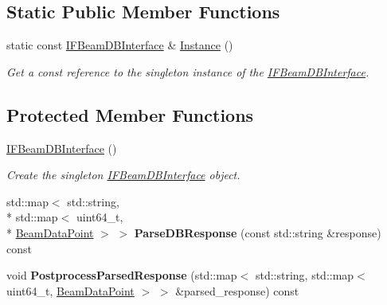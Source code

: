 \subsection*{Static Public Member Functions}
\begin{DoxyCompactItemize}
\item 
\hypertarget{classIFBeamDBInterface_a677ed1a3b7dbfc70ffb0688078ae5fb0}{static const \hyperlink{classIFBeamDBInterface}{I\-F\-Beam\-D\-B\-Interface} \& \hyperlink{classIFBeamDBInterface_a677ed1a3b7dbfc70ffb0688078ae5fb0}{Instance} ()}\label{classIFBeamDBInterface_a677ed1a3b7dbfc70ffb0688078ae5fb0}

\begin{DoxyCompactList}\small\item\em Get a const reference to the singleton instance of the \hyperlink{classIFBeamDBInterface}{I\-F\-Beam\-D\-B\-Interface}. \end{DoxyCompactList}\end{DoxyCompactItemize}
\subsection*{Protected Member Functions}
\begin{DoxyCompactItemize}
\item 
\hypertarget{classIFBeamDBInterface_af5275e528b9b43d4c5dacd0a8a3ca62b}{\hyperlink{classIFBeamDBInterface_af5275e528b9b43d4c5dacd0a8a3ca62b}{I\-F\-Beam\-D\-B\-Interface} ()}\label{classIFBeamDBInterface_af5275e528b9b43d4c5dacd0a8a3ca62b}

\begin{DoxyCompactList}\small\item\em Create the singleton \hyperlink{classIFBeamDBInterface}{I\-F\-Beam\-D\-B\-Interface} object. \end{DoxyCompactList}\item 
\hypertarget{classIFBeamDBInterface_a950bec54fb41eaf48471a8a1eab8ab71}{std\-::map$<$ std\-::string, \\*
std\-::map$<$ uint64\-\_\-t, \\*
\hyperlink{structBeamDataPoint}{Beam\-Data\-Point} $>$ $>$ {\bfseries Parse\-D\-B\-Response} (const std\-::string \&response) const }\label{classIFBeamDBInterface_a950bec54fb41eaf48471a8a1eab8ab71}

\item 
\hypertarget{classIFBeamDBInterface_a2d7b151e8b21fe5f7d255d442d37e321}{void {\bfseries Postprocess\-Parsed\-Response} (std\-::map$<$ std\-::string, std\-::map$<$ uint64\-\_\-t, \hyperlink{structBeamDataPoint}{Beam\-Data\-Point} $>$ $>$ \&parsed\-\_\-response) const }\label{classIFBeamDBInterface_a2d7b151e8b21fe5f7d255d442d37e321}

\end{DoxyCompactItemize}
